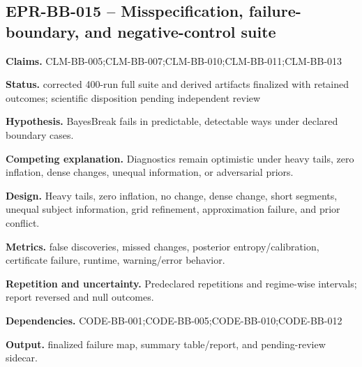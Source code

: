 \subsection{EPR-BB-015 -- Misspecification, failure-boundary, and negative-control suite}
\textbf{Claims.} CLM-BB-005;CLM-BB-007;CLM-BB-010;CLM-BB-011;CLM-BB-013\par
\textbf{Status.} corrected 400-run full suite and derived artifacts finalized with retained outcomes; scientific disposition pending independent review\par
\textbf{Hypothesis.} BayesBreak fails in predictable, detectable ways under declared boundary cases.\par
\textbf{Competing explanation.} Diagnostics remain optimistic under heavy tails, zero inflation, dense changes, unequal information, or adversarial priors.\par
\textbf{Design.} Heavy tails, zero inflation, no change, dense change, short segments, unequal subject information, grid refinement, approximation failure, and prior conflict.\par
\textbf{Metrics.} false discoveries, missed changes, posterior entropy/calibration, certificate failure, runtime, warning/error behavior.\par
\textbf{Repetition and uncertainty.} Predeclared repetitions and regime-wise intervals; report reversed and null outcomes.\par
\textbf{Dependencies.} CODE-BB-001;CODE-BB-005;CODE-BB-010;CODE-BB-012\par
\textbf{Output.} finalized failure map, summary table/report, and pending-review sidecar.

